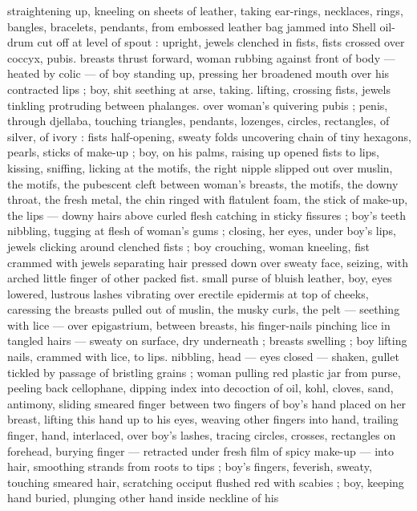 straightening up, kneeling on sheets of leather, taking ear-rings,
necklaces, rings, bangles, bracelets, pendants, from embossed
leather bag jammed into Shell oil-drum cut off at level of spout :
upright, jewels clenched in fists, fists crossed over coccyx, pubis.
breasts thrust forward, woman rubbing against front of body ---
heated by colic --- of boy standing up, pressing her broadened
mouth over his contracted lips ; boy, shit seething at arse, taking.
lifting, crossing fists, jewels tinkling protruding between phalanges.
over woman's quivering pubis ; penis, through djellaba, touching
triangles, pendants, lozenges, circles, rectangles, of silver, of ivory :
fists half-opening, sweaty folds uncovering chain of tiny hexagons,
pearls, sticks of make-up ; boy, on his palms, raising up opened fists
to lips, kissing, sniffing, licking at the motifs, the right nipple slipped
out over muslin, the motifs, the pubescent cleft between woman's
breasts, the motifs, the downy throat, the fresh metal, the chin ringed
with flatulent foam, the stick of make-up, the lips --- downy hairs
above curled flesh catching in sticky fissures ; boy's teeth nibbling,
tugging at flesh of woman's gums ; closing, her eyes, under boy's
lips, jewels clicking around clenched fists ; boy crouching, woman
kneeling, fist crammed with jewels separating hair pressed down over
sweaty face, seizing, with arched little finger of other packed fist.
small purse of bluish leather, boy, eyes lowered, lustrous lashes
vibrating over erectile epidermis at top of cheeks, caressing the
breasts pulled out of muslin, the musky curls, the pelt --- seething
with lice --- over epigastrium, between breasts, his finger-nails
pinching lice in tangled hairs --- sweaty on surface, dry underneath
; breasts swelling ; boy lifting nails, crammed with lice, to lips.
nibbling, head --- eyes closed --- shaken, gullet tickled by passage
of bristling grains ; woman pulling red plastic jar from purse, peeling
back cellophane, dipping index into decoction of oil, kohl, cloves,
sand, antimony, sliding smeared finger between two fingers of boy's
hand placed on her breast, lifting this hand up to his eyes, weaving
other fingers into hand, trailing finger, hand, interlaced, over boy's
lashes, tracing circles, crosses, rectangles on forehead, burying
finger --- retracted under fresh film of spicy make-up --- into hair,
smoothing strands from roots to tips ; boy's fingers, feverish, sweaty,
touching smeared hair, scratching occiput flushed red with scabies ;
boy, keeping hand buried, plunging other hand inside neckline of his
